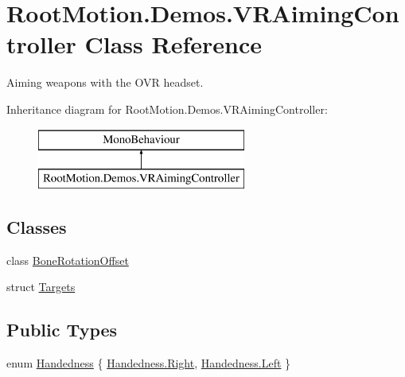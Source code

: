 \hypertarget{class_root_motion_1_1_demos_1_1_v_r_aiming_controller}{}\section{Root\+Motion.\+Demos.\+V\+R\+Aiming\+Controller Class Reference}
\label{class_root_motion_1_1_demos_1_1_v_r_aiming_controller}


Aiming weapons with the O\+VR headset.  


Inheritance diagram for Root\+Motion.\+Demos.\+V\+R\+Aiming\+Controller\+:\begin{figure}[H]
\begin{center}
\leavevmode
\includegraphics[height=2.000000cm]{class_root_motion_1_1_demos_1_1_v_r_aiming_controller}
\end{center}
\end{figure}
\subsection*{Classes}
\begin{DoxyCompactItemize}
\item 
class \mbox{\hyperlink{class_root_motion_1_1_demos_1_1_v_r_aiming_controller_1_1_bone_rotation_offset}{Bone\+Rotation\+Offset}}
\item 
struct \mbox{\hyperlink{struct_root_motion_1_1_demos_1_1_v_r_aiming_controller_1_1_targets}{Targets}}
\end{DoxyCompactItemize}
\subsection*{Public Types}
\begin{DoxyCompactItemize}
\item 
enum \mbox{\hyperlink{class_root_motion_1_1_demos_1_1_v_r_aiming_controller_ab88bf3b4946db8022f1a2049e3fc9399}{Handedness}} \{ \mbox{\hyperlink{class_root_motion_1_1_demos_1_1_v_r_aiming_controller_ab88bf3b4946db8022f1a2049e3fc9399a92b09c7c48c520c3c55e497875da437c}{Handedness.\+Right}}, 
\mbox{\hyperlink{class_root_motion_1_1_demos_1_1_v_r_aiming_controller_ab88bf3b4946db8022f1a2049e3fc9399a945d5e233cf7d6240f6b783b36a374ff}{Handedness.\+Left}}
 \}
\end{DoxyCompactItemize}

